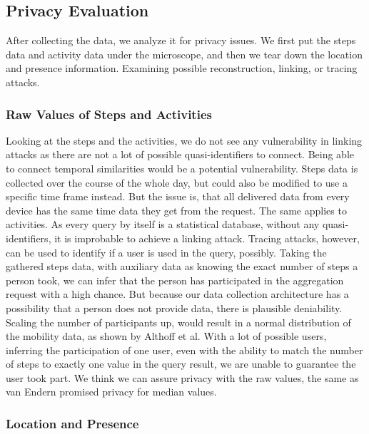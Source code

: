 \subsection{Privacy Evaluation}
After collecting the data, we analyze it for privacy issues. We first put the steps data and activity data under the microscope, and then we tear down the location and presence information. Examining possible reconstruction, linking, or tracing attacks.

\subsubsection{Raw Values of Steps and Activities}
Looking at the steps and the activities, we do not see any vulnerability in linking attacks as there are not a lot of possible quasi-identifiers to connect. Being able to connect temporal similarities would be a potential vulnerability. Steps data is collected over the course of the whole day, but could also be modified to use a specific time frame instead. But the issue is, that all delivered data from every device has the same time data they get from the request. The same applies to activities. As every query by itself is a statistical database, without any quasi-identifiers, it is improbable to achieve a linking attack. 
Tracing attacks, however, can be used to identify if a user is used in the query, possibly. Taking the gathered steps data, with auxiliary data as knowing the exact number of steps a person took, we can infer that the person has participated in the aggregation request with a high chance. But because our data collection architecture has a possibility that a person does not provide data, there is plausible deniability. Scaling the number of participants up, would result in a normal distribution of the mobility data, as shown by Althoff et al. With a lot of possible users, inferring the participation of one user, even with the ability to match the number of steps to exactly one value in the query result, we are unable to guarantee the user took part. We think we can assure privacy with the raw values, the same as van Endern promised privacy for median values.

\subsubsection{Location and Presence}

